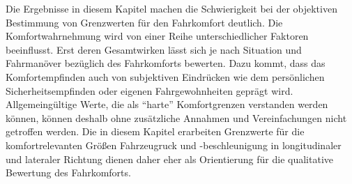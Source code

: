 Die Ergebnisse in diesem Kapitel machen die Schwierigkeit bei der objektiven Bestimmung von Grenzwerten für den Fahrkomfort deutlich. Die Komfortwahrnehmung wird von einer Reihe unterschiedlicher Faktoren beeinflusst. Erst deren Gesamtwirken lässt sich je nach Situation und Fahrmanöver bezüglich des Fahrkomforts bewerten. Dazu kommt, dass das Komfortempfinden auch von subjektiven Eindrücken wie dem persönlichen Sicherheitsempfinden oder eigenen Fahrgewohnheiten geprägt wird. Allgemeingültige Werte, die als ``harte'' Komfortgrenzen verstanden werden können, können deshalb ohne zusätzliche Annahmen und Vereinfachungen nicht getroffen werden. Die in diesem Kapitel erarbeiten Grenzwerte für die komfortrelevanten Größen Fahrzeugruck und -beschleunigung in longitudinaler und lateraler Richtung dienen daher eher als Orientierung für die qualitative Bewertung des Fahrkomforts.

